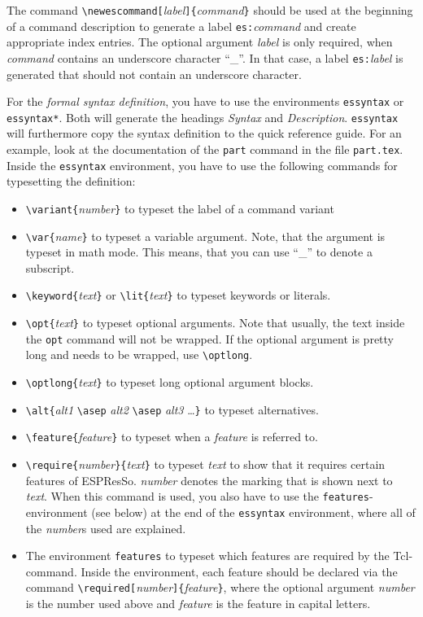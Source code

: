 \documentclass[
a4paper,                        %
11pt,                           %
twoside,                        %
footsepline,                    %
headsepline,                    %
headexclude,                    %
footexclude,                    %
pagesize,                       %
bibtotocnumbered,               %
idxtotoc                        %
]{scrreprt}
\newcommand{\es}{\mbox{\textsf{ESPResSo}}\xspace}
\begin{document}
The command
\verb!\newescommand[!\textit{label}\verb!]{!\textit{command}\verb!}!
should be used at the beginning of a command description to generate a
label \verb!es:!\textit{command} and create appropriate index
entries. The optional argument \textit{label} is only required, when
\textit{command} contains an underscore character ``\_''. In that
case, a label \verb!es:!\textit{label} is generated that should not
contain an underscore character.

For the \emph{formal syntax definition}, you have to use the
environments \texttt{essyntax} or \texttt{essyntax*}.  Both will
generate the headings \emph{Syntax} and
\emph{Description}. \texttt{essyntax} will furthermore copy the syntax
definition to the quick reference guide.  For an example, look at the
documentation of the \texttt{part} command in the file
\texttt{part.tex}. Inside the \texttt{essyntax} environment, you have
to use the following commands for typesetting the definition:
\begin{itemize}
\item \verb!\variant{!\textit{number}\verb!}! to typeset the label of a
  command variant
\item \verb!\var{!\textit{name}\verb!}! to typeset a variable
  argument. Note, that the argument is typeset in math mode.  This
  means, that you can use ``\_'' to denote a subscript.
\item \verb!\keyword{!\textit{text}\verb!}! or
  \verb!\lit{!\textit{text}\verb!}! to typeset keywords or literals.
\item \verb!\opt{!\textit{text}\verb!}! to typeset optional
  arguments. Note that usually, the text inside the \texttt{opt}
  command will not be wrapped. If the optional argument is pretty long
  and needs to be wrapped, use \verb!\optlong!.
\item \verb!\optlong{!\textit{text}\verb!}! to typeset long optional
  argument blocks.
\item \verb!\alt{!\textit{alt1} \verb!\asep! \textit{alt2}
    \verb!\asep! \textit{alt3} \dots \verb!}! to typeset alternatives.
\item \verb!\feature{!\textit{feature}\verb!}! to typeset when a
  \textit{feature} is referred to.
\item \verb!\require{!\textit{number}\verb!}{!\textit{text}\verb!}! to
  typeset \textit{text} to show that it requires certain features of
  \es. \textit{number} denotes the marking that is shown next to
  \textit{text}. When this command is used, you also have to use the
  \texttt{features}-environment (see below) at the end of the
  \texttt{essyntax} environment, where all of the \textit{number}s
  used are explained.
\item The environment \texttt{features} to typeset which features are
  required by the Tcl-command. Inside the environment, each feature
  should be declared via the command
  \verb!\required[!\textit{number}\verb!]{!\textit{feature}\verb!}!,
  where the optional argument \textit{number} is the number used above
  and \textit{feature} is the feature in capital letters.
\end{itemize}
\end{document}
